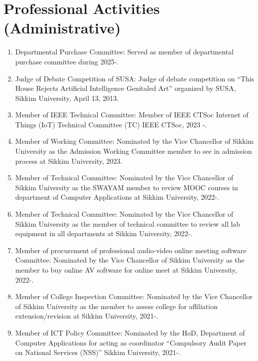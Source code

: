 \documentclass[11pt,a4paper]{moderncv}
\begin{document}
\section{\textbf{Professional Activities (Administrative)}}

\begin{adjustwidth}{6em}{0pt}
	\begin{enumerate}
		\item Departmental Purchase Committee: Served as member of departmental purchase committee during 2025-.
		
		\item Judge of Debate Competition of SUSA: Judge of debate competition on “This House Rejects Artificial Intelligence Genitaled Art” organized by SUSA, Sikkim University, April 13, 2013.
		
		\item Member of IEEE Technical Committee: Member of IEEE CTSoc Internet of Things (IoT) Technical Committee (TC) IEEE CTSoc, 2023 -.
		
		\item Member of Working Committee: Nominated by the Vice Chancellor of Sikkim University as the Admission Working Committee member to see in admission process at Sikkim University, 2023.
		
		\item Member of Technical Committee: Nominated by the Vice Chancellor of Sikkim University as the SWAYAM member to review MOOC courses in department of Computer Applications at Sikkim University, 2022-.
		
		\item Member of Technical Committee: Nominated by the Vice Chancellor of Sikkim University as the member of technical committee to review all lab equipment in all departments at Sikkim University, 2022-.
		
		\item Member of procurement of professional audio-video online meeting software Committee: Nominated by the Vice Chancellor of Sikkim University as the member to buy online AV software for online meet at Sikkim University, 2022-.
		
		\item Member of College Inspection Committee: Nominated by the Vice Chancellor of Sikkim University as the member to assess college for affiliation extension/revision at Sikkim University, 2021-.
		
		\item Member of ICT Policy Committee: Nominated by the HoD, Department of Computer Applications for acting as coordinator “Compulsory Audit Paper on National Services (NSS)” Sikkim University, 2021-.
		

\end{enumerate}
\end{adjustwidth}
\end{document}
